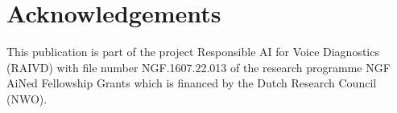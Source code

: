\documentclass{Interspeech}
\begin{document}





\section{Acknowledgements}
This publication is part of the project Responsible AI for Voice Diagnostics (RAIVD) with file number NGF.1607.22.013 of the research programme NGF AiNed Fellowship Grants which is financed by the Dutch Research Council (NWO).



\end{document}
